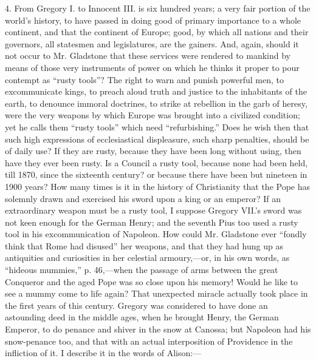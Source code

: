 4. From Gregory I. to Innocent III. is six hundred years; a very fair
portion of the world's history, to have passed in doing good of primary
importance to a whole continent, and that the continent of Europe; good,
by which all nations and their governors, all statesmen and
legislatures, are the gainers. And, again, should it not occur to Mr.
Gladstone that these services were rendered to mankind by means of those
very instruments of power on which he thinks it proper to pour contempt
as ``rusty tools''? The right to warn and punish powerful men,
to excommunicate kings, to preach aloud truth and justice to the
inhabitants of the earth, to denounce immoral doctrines, to strike at
rebellion in the garb of heresy, were the very weapons by which Europe
was brought into a civilized condition; yet he calls them ``rusty
tools'' which need ``refurbishing.'' Does he wish then that
such high expressions of ecclesiastical displeasure, such sharp
penalties, should be of daily use? If they are rusty, because they have
been long without using, then have they ever been rusty. Is a
Council a rusty tool, because none had been held, till 1870, since the
sixteenth century? or because there have been but nineteen in 1900
years? How many times is it in the history of Christianity that the Pope
has solemnly drawn and exercised his sword upon a king or an emperor? If
an extraordinary weapon must be a rusty tool, I suppose Gregory VII.'s
sword was not keen enough for the German Henry; and the seventh Pius too
used a rusty tool in his excommunication of Napoleon. How could Mr.
Gladstone ever ``fondly think that Rome had disused'' her
weapons, and that they had hung up as antiquities and curiosities in her
celestial armoury,—or, in his own words, as ``hideous
mummies,'' p. 46,—when the passage of arms between the great
Conqueror and the aged Pope was so close upon his memory! Would he like
to see a mummy come to life again? That unexpected miracle actually took
place in the first years of this century. Gregory was considered to have
done an astounding deed in the middle ages, when he brought Henry, the
German Emperor, to do penance and shiver in the snow at Canossa; but
Napoleon had his snow-penance too, and that with an actual interposition
of Providence in the infliction of it. I describe it in the words of
Alison:—

